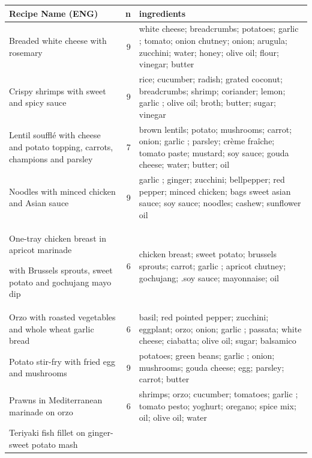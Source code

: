 \begin{table}[ht]
\centering
\begin{tabular}{lrl}
  \hline
Recipe Name (ENG) & n & ingredients \\ 
  \hline
Breaded white cheese with rosemary &   9 &  white cheese; breadcrumbs;  potatoes;  garlic ;  tomato; onion chutney;  onion; arugula;  zucchini; water;  honey;  olive oil;    flour;  vinegar;  butter \\ 
  Crispy shrimps with sweet and spicy sauce &   9 &  rice;  cucumber;   radish; grated coconut; breadcrumbs;  shrimp;  coriander;  lemon;  garlic ;  olive oil; broth;  butter;  sugar;  vinegar \\ 
  Lentil soufflé with cheese and potato topping, carrots, champions and parsley &   7 &  brown lentils;  potato;  mushrooms;  carrot;  onion;  garlic ; parsley;  crème fraîche;  tomato paste; mustard; soy sauce;  gouda cheese; water;  butter; oil \\ 
  Noodles with minced chicken and Asian sauce &   9 & garlic ; ginger;  zucchini;  bellpepper;   red pepper;  minced chicken; bags sweet asian sauce; soy sauce;  noodles; cashew;  sunflower oil \\ 
  One-tray chicken breast in apricot marinade

with Brussels sprouts, sweet potato and gochujang mayo dip &   6 &  chicken breast;  sweet potato;  brussels sprouts;  carrot;  garlic ; apricot chutney; gochujang; .soy sauce; mayonnaise;  oil \\ 
  Orzo with roasted vegetables and whole wheat garlic bread &   6 & basil;  red pointed pepper;  zucchini; eggplant;  orzo;  onion; garlic ;  passata; white cheese;  ciabatta;  olive oil;  sugar;  balsamico \\ 
  Potato stir-fry with fried egg and mushrooms &   9 &  potatoes;  green beans;  garlic ;  onion;  mushrooms;  gouda cheese; egg;  parsley; carrot;   butter \\ 
  Prawns in Mediterranean marinade on orzo &   6 &  shrimps;  orzo;  cucumber; tomatoes;  garlic ; tomato pesto; yoghurt;  oregano;  spice mix;  oil;  olive oil; water \\ 
  Teriyaki fish fillet on ginger-sweet potato mash


\end{tabular}
\end{table}
